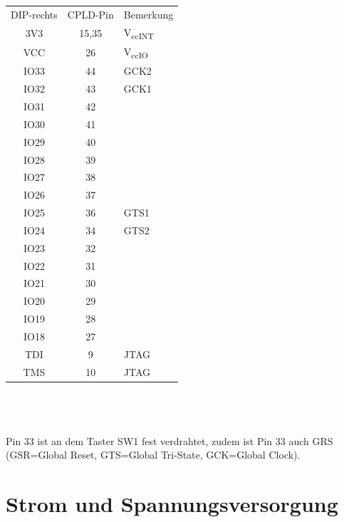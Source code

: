 \documentclass{article}
\begin{document}
\begin{minipage}{0.2\textwidth}
	\begin{tabular}{||c|c|l}
		DIP-rechts	& CPLD-Pin & Bemerkung\\
		\rowcolor[gray]{.8}	3V3		& 15,35 &	V\textsubscript{ccINT} \\
		VCC		& 26 & 		V\textsubscript{ccIO}\\
		\rowcolor[gray]{.8}	IO33	& 44 &		GCK2\\
		IO32	& 43 &		GCK1\\
		\rowcolor[gray]{.8}	IO31	& 42 &\\
		IO30	& 41 &\\
		\rowcolor[gray]{.8}	IO29	& 40 &\\
		IO28	& 39 &\\
		\rowcolor[gray]{.8}	IO27	& 38 &\\
		IO26	& 37 &\\
		\rowcolor[gray]{.8}	IO25	& 36 &		GTS1\\
		IO24	& 34 &							GTS2\\
		\rowcolor[gray]{.8}	IO23	& 32 &\\
		IO22	& 31 &\\
		\rowcolor[gray]{.8}	IO21	& 30 &\\
		IO20	& 29 &\\
		\rowcolor[gray]{.8}	IO19	& 28 &\\
		IO18	& 27 &\\
		\rowcolor[gray]{.8}	TDI		& 9 &		JTAG\\	
		TMS		& 10 & 		JTAG 
	\end{tabular}
\end{minipage}
\\\\\\
Pin 33 ist an dem Taster SW1 fest verdrahtet, zudem ist Pin 33 auch GRS
(GSR=Global Reset, GTS=Global Tri-State, GCK=Global Clock).
\newpage




\section{Strom und Spannungsversorgung}
\end{document}
